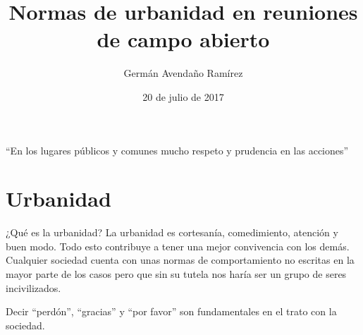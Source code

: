 \documentclass{beamer}
\title{Normas de urbanidad en reuniones de campo abierto}
\author[Germán Darío]{Germán Avendaño Ramírez}
\institute[Universities of Somewhere and Elsewhere] 
{
  \inst{}%
  Colegio Arborizadora Baja I.E.D.
  }
\date{20 de julio de 2017}
\begin{document}
\begin{frame}
  \titlepage
\end{frame}

\begin{frame}{``En los lugares públicos y comunes mucho respeto y prudencia en las acciones''}
  \tableofcontents
\end{frame}



 \section{Urbanidad}
 \begin{frame}{¿Qué es la urbanidad?}
 La urbanidad es cortesanía, comedimiento, atención y buen modo. Todo esto contribuye a tener una mejor convivencia con los demás. Cualquier sociedad cuenta con unas normas de comportamiento no escritas en la mayor parte de los casos pero que sin su tutela nos haría ser un grupo de seres incivilizados.
 \end{frame}
 \begin{frame}{}
Decir ``perdón'', ``gracias'' y ``por favor'' son fundamentales en el trato con la sociedad.
\end{frame}
\end{document}
